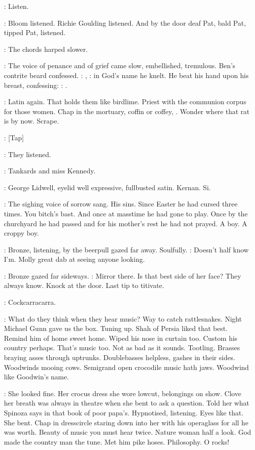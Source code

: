 \BloomInt:
Listen.

:
Bloom listened. Richie Goulding listened. And by the door
deaf Pat, bald Pat, tipped Pat, listened.

:
The chords harped slower.

:
The voice of penance and of grief came slow, embellished, tremulous.
Ben's contrite beard confessed.
\dollard:
,
:
in God's name he knelt.
He beat his hand upon his breast, confessing:
\dollard:
.

\BloomInt:
Latin again. That holds them like birdlime. Priest with the
communion corpus for those women. Chap in the mortuary, coffin or
coffey, .
Wonder where that rat is by now. Scrape.

\stripling:
[Tap]

:
They listened.

:
Tankards and miss Kennedy.

:
George Lidwell, eyelid
well expressive, fullbusted satin. Kernan. Si.

:
The sighing voice of sorrow sang.
His sins. Since Easter he had
cursed three times. You bitch's bast. And once at masstime he had gone to
play. Once by the churchyard he had passed and for his mother's rest he
had not prayed. A boy. A croppy boy.

:
Bronze, listening, by the beerpull gazed far away. Soulfully.
\BloomInt:
Doesn't half know I'm. Molly great dab at seeing anyone looking.

:
Bronze gazed far sideways.
\BloomInt:
Mirror there. Is that best side of her face?
They always know. Knock at the door. Last tip to titivate.

\BloomInt:
Cockcarracarra.

\BloomInt:
What do they think when they hear music? Way to catch rattlesnakes.
Night Michael Gunn gave us the box.
Tuning up. Shah of Persia liked that
best. Remind him of home sweet home. Wiped his nose in curtain too.
Custom his country perhaps. That's music too. Not as bad as it sounds.
Tootling. Brasses braying asses through uptrunks. Doublebasses helpless,
gashes in their sides. Woodwinds mooing cows. Semigrand open crocodile
music hath jaws. Woodwind like Goodwin's name.

\BloomInt:
She looked fine. Her crocus dress she wore lowcut, belongings on
show. Clove her breath was always in theatre when she bent to ask a
question. Told her what Spinoza says in that book of poor papa's.
Hypnotised, listening. Eyes like that. She bent. Chap in dresscircle
staring down into her with his operaglass for all he was worth.
Beauty of music you must hear twice. Nature woman half a look. God made the
country man the tune. Met him pike hoses. Philosophy. O rocks!

